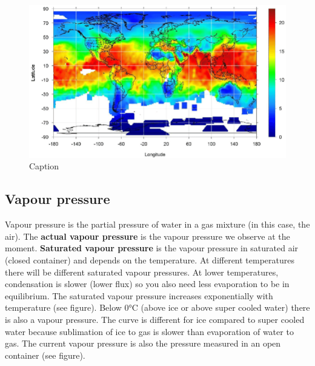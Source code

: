 \documentclass[12pt,oneside]{book}
\begin{document}
\begin{figure}

{\centering \includegraphics[width=0.9\linewidth]{figures/Figure231} 

}

\caption{Caption}\label{fig:Humidityterm5}
\end{figure}

\subsection{Vapour pressure}\label{vapour-pressure}

Vapour pressure is the partial pressure of water in a gas mixture (in
this case, the air). The \textbf{actual vapour pressure} is the vapour
pressure we observe at the moment. \textbf{Saturated vapour pressure} is
the vapour pressure in saturated air (closed container) and depends on
the temperature. At different temperatures there will be different
saturated vapour pressures. At lower temperatures, condensation is
slower (lower flux) so you also need less evaporation to be in
equilibrium. The saturated vapour pressure increases exponentially with
temperature (see figure). Below 0°C (above ice or above super cooled
water) there is also a vapour pressure. The curve is different for ice
compared to super cooled water because sublimation of ice to gas is
slower than evaporation of water to gas. The current vapour pressure is
also the pressure measured in an open container (see figure).
\end{document}
